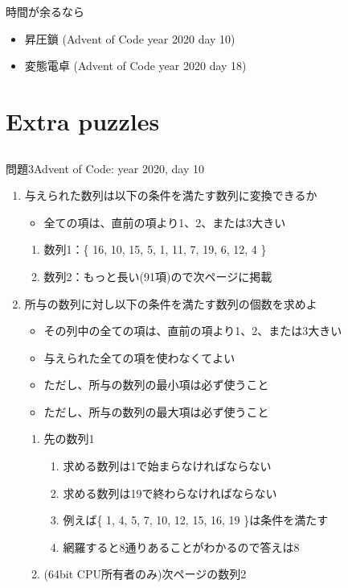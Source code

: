 \documentclass{beamer}
\begin{document}
\begin{frame}[fragile]{時間が余るなら}{}
\begin{itemize}\itemsep8pt
\item 昇圧鎖 (Advent of Code year 2020 day 10)
\item 変態電卓 (Advent of Code year 2020 day 18)
\end{itemize}
\end{frame}


\section{Extra puzzles}		%
\subsection{}

\begin{frame}[fragile]{問題3}{Advent of Code: year 2020, day 10}
\begin{enumerate}\itemsep8pt
\item 与えられた数列は以下の条件を満たす数列に変換できるか
\begin{itemize}%
\item 全ての項は、直前の項より1、2、または3大きい
\end{itemize}
\begin{enumerate}%
\item 数列1：\{ 16, 10, 15, 5, 1, 11, 7, 19, 6, 12, 4 \}
\item 数列2：もっと長い(91項)ので次ページに掲載
\end{enumerate}
\item 所与の数列に対し以下の条件を満たす数列の個数を求めよ
\begin{itemize}%
\item その列中の全ての項は、直前の項より1、2、または3大きい
\item 与えられた全ての項を使わなくてよい
\item ただし、所与の数列の最小項は必ず使うこと
\item ただし、所与の数列の最大項は必ず使うこと
\end{itemize}
\begin{enumerate}%
\item 先の数列1
\begin{enumerate}%
\item 求める数列は1で始まらなければならない
\item 求める数列は19で終わらなければならない
\item 例えば\{ 1, 4, 5, 7, 10, 12, 15, 16, 19 \}は条件を満たす
\item 網羅すると8通りあることがわかるので答えは8
\end{enumerate}
\item (64bit CPU所有者のみ)次ページの数列2
\end{enumerate}
\end{enumerate}
\end{frame}
\end{document}
